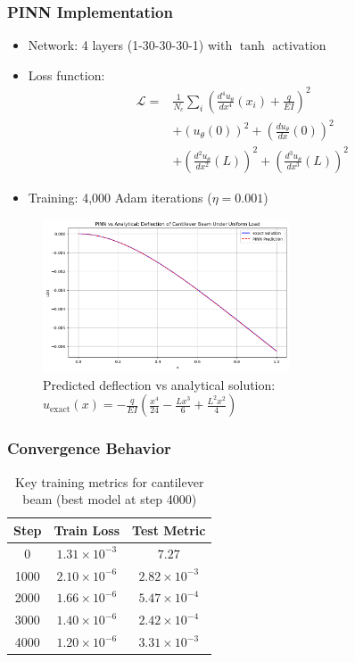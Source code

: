 \documentclass[12pt]{article}
\begin{document}
\subsubsection{PINN Implementation}
\begin{itemize}
    \item Network: 4 layers (1-30-30-30-1) with $\tanh$ activation
    \item Loss function:
    \begin{align*}
    \mathcal{L} = &\frac{1}{N_c}\sum_{i}\left(\frac{d^4u_{\theta}}{dx^4}(x_i) + \frac{q}{EI}\right)^2 \\
    &+ \left(u_{\theta}(0)\right)^2 + \left(\frac{du_{\theta}}{dx}(0)\right)^2 \\
    &+ \left(\frac{d^2u_{\theta}}{dx^2}(L)\right)^2 + \left(\frac{d^3u_{\theta}}{dx^3}(L)\right)^2
    \end{align*}
    \item Training: 4,000 Adam iterations ($\eta=0.001$)
\end{itemize}

\begin{figure}[htbp]
    \centering
    \includegraphics[width=0.65\textwidth]{cantilever_results.png}
    \caption{Predicted deflection vs analytical solution: $u_{\text{exact}}(x) = -\frac{q}{EI}\left(\frac{x^4}{24} - \frac{Lx^3}{6} + \frac{L^2x^2}{4}\right)$}
    \label{fig:cantilever}
\end{figure}

\subsubsection{Convergence Behavior}
\begin{table}[htbp]
    \centering
    \begin{tabular}{c c c}
        \toprule
        \textbf{Step} & \textbf{Train Loss} & \textbf{Test Metric} \\
        \midrule
        0 & $1.31 \times 10^{-3}$ & $7.27$ \\
        1000 & $2.10 \times 10^{-6}$ & $2.82 \times 10^{-3}$ \\
        2000 & $1.66 \times 10^{-6}$ & $5.47 \times 10^{-4}$ \\
        3000 & $1.40 \times 10^{-6}$ & $2.42 \times 10^{-4}$ \\
        4000 & $1.20 \times 10^{-6}$ & $3.31 \times 10^{-3}$ \\
        \bottomrule
    \end{tabular}
    \caption{Key training metrics for cantilever beam (best model at step 4000)}
\end{table}
\end{document}
